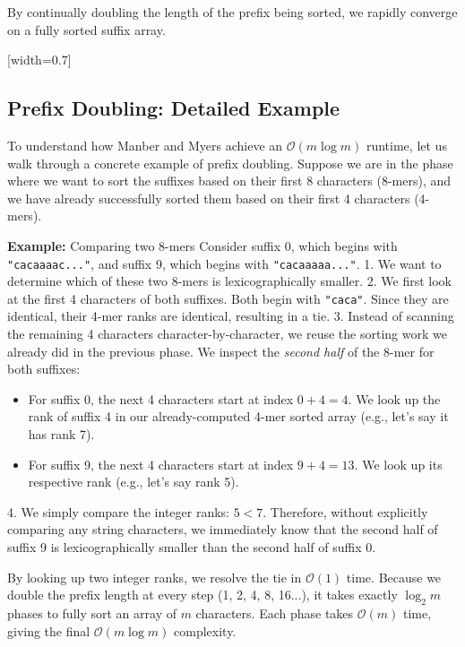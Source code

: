 By continually doubling the length of the prefix being sorted, we rapidly converge on a fully sorted suffix array.

[width=0.7\textwidth]

\subsection{Prefix Doubling: Detailed Example}

To understand how Manber and Myers achieve an \(\mathcal{O}(m \log m)\) runtime, let us walk through a concrete example of prefix doubling. Suppose we are in the phase where we want to sort the suffixes based on their first 8 characters (8-mers), and we have already successfully sorted them based on their first 4 characters (4-mers).

\textbf{Example:} Comparing two 8-mers
Consider suffix 0, which begins with \texttt{"cacaaaac..."}, and suffix 9, which begins with \texttt{"cacaaaaa..."}. 
1. We want to determine which of these two 8-mers is lexicographically smaller.
2. We first look at the first 4 characters of both suffixes. Both begin with \texttt{"caca"}. Since they are identical, their 4-mer ranks are identical, resulting in a tie.
3. Instead of scanning the remaining 4 characters character-by-character, we reuse the sorting work we already did in the previous phase. We inspect the \textit{second half} of the 8-mer for both suffixes:
   \begin{itemize}
       \item For suffix 0, the next 4 characters start at index $0 + 4 = 4$. We look up the rank of suffix 4 in our already-computed 4-mer sorted array (e.g., let's say it has rank 7).
       \item For suffix 9, the next 4 characters start at index $9 + 4 = 13$. We look up its respective rank (e.g., let's say rank 5).
   \end{itemize}
4. We simply compare the integer ranks: $5 < 7$. Therefore, without explicitly comparing any string characters, we immediately know that the second half of suffix 9 is lexicographically smaller than the second half of suffix 0. 

\sta By looking up two integer ranks, we resolve the tie in \(\mathcal{O}(1)\) time. Because we double the prefix length at every step (1, 2, 4, 8, 16...), it takes exactly \(\log_2 m\) phases to fully sort an array of $m$ characters. Each phase takes \(\mathcal{O}(m)\) time, giving the final \(\mathcal{O}(m \log m)\) complexity.

